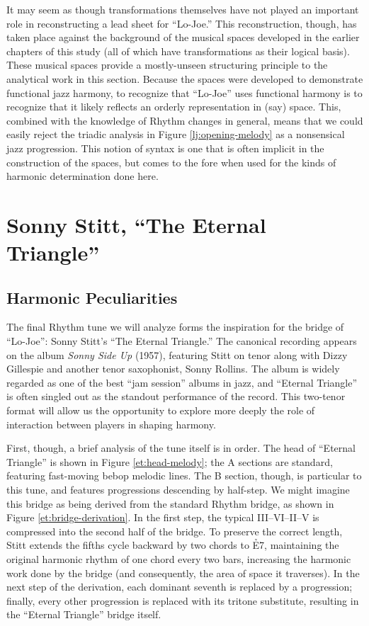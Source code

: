 It may seem as though transformations themselves have not played an important
role in reconstructing a lead sheet for ``Lo-Joe.'' This reconstruction,
though, has taken place against the background of the musical spaces developed
in the earlier chapters of this study (all of which have transformations as
their logical basis). These musical spaces provide a mostly-unseen structuring
principle to the analytical work in this section. Because the spaces were
developed to demonstrate functional jazz harmony, to recognize that ``Lo-Joe''
uses functional harmony is to recognize that it likely reflects an orderly
representation in (say) \tf space. This, combined with the knowledge of Rhythm
changes in general, means that we could easily reject the triadic analysis in
Figure \ref{lj:opening-melody} as a nonsensical jazz progression. This notion
of syntax is one that is often implicit in the construction of the spaces, but
comes to the fore when used for the kinds of harmonic determination done
here.

\section{Sonny Stitt, “The Eternal Triangle”}
\label{sec:eternal-triangle}

\subsection{Harmonic Peculiarities}

The final Rhythm tune we will analyze forms the inspiration for the bridge of
``Lo-Joe'': Sonny Stitt's ``The Eternal Triangle.'' The
canonical recording appears on the album \emph{Sonny Side Up} (1957),
featuring Stitt on tenor along with Dizzy Gillespie and another tenor
saxophonist, Sonny Rollins.\nocite{gillespie:sonnyside} The album is widely
regarded as one of the best ``jam session'' albums in jazz, and ``Eternal
Triangle'' is often singled out as the standout performance of the
record. This two-tenor format will allow us the opportunity to
explore more deeply the role of interaction between players in shaping
harmony.

First, though, a brief analysis of the tune itself is in order. The head of
``Eternal Triangle'' is shown in Figure \ref{et:head-melody}; the A sections
are standard, featuring fast-moving bebop melodic lines. The B section,
though, is particular to this tune, and features \tf progressions descending
by half-step. We might imagine this bridge as being derived from the standard
Rhythm bridge, as shown in Figure \ref{et:bridge-derivation}. In the first
step, the typical III--VI--II--V is compressed into the second half of the
bridge. To preserve the correct length, Stitt extends the fifths cycle
backward by two chords to \h{E7}, maintaining the original harmonic rhythm of
one chord every two bars, increasing the harmonic work done by the bridge (and
consequently, the area of \tf space it traverses). In the next step of the
derivation, each dominant seventh is replaced by a \tf progression;
finally, every other \tf progression is replaced with its tritone
substitute, resulting in the ``Eternal Triangle'' bridge itself.

